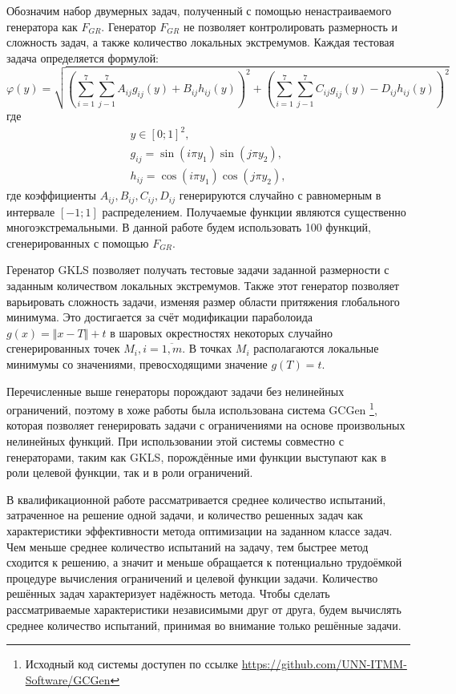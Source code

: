 Обозначим набор двумерных задач, полученный с помощью ненастраиваемого генератора
как \(F_{GR}\). Генератор \(F_{GR}\) не позволяет контролировать размерность и сложность задач, а также количество локальных экстремумов.
Каждая тестовая задача определяется формулой:
\begin{displaymath}
  \varphi(y)=\sqrt{\left(\sum_{i=1}^7\sum_{j-1}^7 A_{ij}g_{ij}(y)+ B_{ij}h_{ij}(y)\right)^2+\left(\sum_{i=1}^7\sum_{j-1}^7 C_{ij}g_{ij}(y) - D_{ij}h_{ij}(y)\right)^2}
\end{displaymath}
где
\begin{displaymath}
  \begin{array}{cr}
    y\in[0;1]^2, \\
    g_{ij}=\sin(i\pi y_1)\sin(j\pi y_2), \\
    h_{ij}=\cos(i\pi y_1)\cos(j\pi y_2),
  \end{array}
\end{displaymath}
где коэффициенты \(A_{ij},B_{ij}, C_{ij}, D_{ij}\) генерируются случайно с равномерным в
интервале \([-1;1]\) распределением.
Получаемые функции являются существенно многоэкстремальными. В данной работе будем использовать 100 функций, сгенерированных с помощью \(F_{GR}\).

Геренатор GKLS  позволяет получать тестовые задачи заданной размерности с заданным количеством локальных
экстремумов. Также этот генератор позволяет варьировать сложность задачи, изменяя размер области притяжения
глобального минимума. Это достигается за счёт модификации параболоида \(g(x)=\Vert x-T\Vert + t\) в
шаровых окрестностях некоторых случайно сгенерированных точек \(M_i, i=\overline{1,m}\). В точках
\(M_i\) располагаются локальные минимумы со значениями, превосходящими значение \(g(T)=t\).

Перечисленные выше генераторы порождают задачи без нелинейных ограничений, поэтому в хоже работы была использована система
GCGen \footnote{Исходный код системы доступен по ссылке \url{https://github.com/UNN-ITMM-Software/GCGen}},
которая позволяет генерировать задачи с ограничениями на основе произвольных нелинейных
функций. При использовании этой системы совместно с генераторами, таким как GKLS, порождённые ими функции выступают как
в роли целевой функции, так и в роли ограничений.

В квалификационной работе рассматривается среднее количество испытаний, затраченное на решение одной задачи, и количество
решенных задач как характеристики эффективности метода оптимизации на заданном классе задач.
Чем меньше среднее количество испытаний на задачу, тем быстрее метод сходится к решению, а значит и
меньше обращается к потенциально трудоёмкой процедуре вычисления ограничений и целевой функции задачи.
Количество решённых задач характеризует надёжность метода. Чтобы сделать рассматриваемые характеристики независимыми друг от друга,
будем вычислять среднее количество испытаний, принимая во внимание только решённые задачи.

